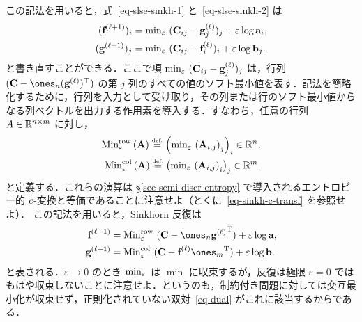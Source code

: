 \begin{rem}
この記法を用いると，式~\eqref{eq-slse-sinkh-1} と~\eqref{eq-slse-sinkh-2} は
\begin{align}
\label{eq-slse-smin-1}(\mathrm{\textbf{f}}^{(\ell+1)})_i &= \text{min}_\varepsilon\,\, (\mathrm{\textbf{C}}_{ij}-\mathrm{\textbf{g}}^{(\ell)}_j)_j + \varepsilon \log \mathrm{\textbf{a}}_i, \\
\label{eq-slse-smin-2}(\mathrm{\textbf{g}}^{(\ell+1)})_j &= \text{min}_\varepsilon\,\, (\mathrm{\textbf{C}}_{ij}-\mathrm{\textbf{f}}^{(\ell)}_i)_i + \varepsilon \log \mathrm{\textbf{b}}_j.
\end{align}
と書き直すことができる．ここで項 $\text{min}_\varepsilon\,\, (\mathrm{\textbf{C}}_{ij}-\mathrm{\textbf{g}}^{(\ell)}_j)_j$ は，行列 $(\C-\ones_n (\it{\gD})^\top )$ の第 $j$ 列のすべての値のソフト最小値を表す．記法を簡略化するために，行列を入力として受け取り，その列または行のソフト最小値からなる列ベクトルを出力する作用素を導入する．すなわち，任意の行列 $A\in\mathbb{R}^{n\times m}$ に対し，
\begin{align*}
	\text{Min}^{\text{row}}_\varepsilon\,(\mathrm{\textbf{A}}) \stackrel{\mbox{\upshape\tiny def.}}{=} \left( \text{min}_\varepsilon\, \left( \mathrm{\textbf{A}}_{i,j} \right)_j \right)_i\in\mathbb{R}^n,\\
	\text{Min}^{\text{col}}_\varepsilon\,(\mathrm{\textbf{A}}) \stackrel{\mbox{\upshape\tiny def.}}{=} \left( \text{min}_\varepsilon\, \left( \mathrm{\textbf{A}}_{i,j} \right)_i \right)_j\in\mathbb{R}^m.
\end{align*}
と定義する．これらの演算は \S\ref{sec-semi-discr-entropy} で導入されるエントロピー的 $c$-変換と等価であることに注意せよ（とくに~\eqref{eq-sinkh-c-transf} を参照せよ）．
%
この記法を用いると，Sinkhorn 反復は
\begin{align}
	\label{eq-lse-dual-1}\itt{\fD} &= \SMINEr\, (\C-\ones_n\transp{\it{\gD}}) + \varepsilon \log \a, \\
	\label{eq-lse-dual-2}\itt{\gD} &= \SMINEc\, (\C-\it{\fD}\transp{\ones_m})  + \varepsilon \log \b.
\end{align}
と表される．$\varepsilon \rightarrow 0$ のとき $\text{min}_\varepsilon\,$ は $\min$ に収束するが，反復は極限 $\varepsilon=0$ ではもはや収束しないことに注意せよ．というのも，制約付き問題に対しては交互最小化が収束せず，正則化されていない双対~\eqref{eq-dual} がこれに該当するからである．
\end{rem}



